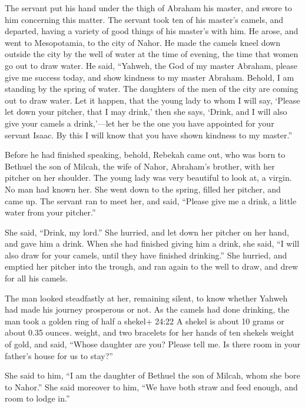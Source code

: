  The servant put his hand under the thigh of Abraham his
master, and swore to him concerning this matter.  The
servant took ten of his master's camels, and departed, having a variety
of good things of his master's with him. He arose, and went to
Mesopotamia, to the city of Nahor.  He made the camels
kneel down outside the city by the well of water at the time of evening,
the time that women go out to draw water.  He said,
``Yahweh, the God of my master Abraham, please give me success today,
and show kindness to my master Abraham.  Behold, I am
standing by the spring of water. The daughters of the men of the city
are coming out to draw water.  Let it happen, that the
young lady to whom I will say, `Please let down your pitcher, that I may
drink,' then she says, `Drink, and I will also give your camels a
drink,'---let her be the one you have appointed for your servant Isaac.
By this I will know that you have shown kindness to my master.''

 Before he had finished speaking, behold, Rebekah came out,
who was born to Bethuel the son of Milcah, the wife of Nahor, Abraham's
brother, with her pitcher on her shoulder.  The young lady
was very beautiful to look at, a virgin. No man had known her. She went
down to the spring, filled her pitcher, and came up.  The
servant ran to meet her, and said, ``Please give me a drink, a little
water from your pitcher.''

 She said, ``Drink, my lord.'' She hurried, and let down
her pitcher on her hand, and gave him a drink.  When she
had finished giving him a drink, she said, ``I will also draw for your
camels, until they have finished drinking.''  She hurried,
and emptied her pitcher into the trough, and ran again to the well to
draw, and drew for all his camels.

 The man looked steadfastly at her, remaining silent, to
know whether Yahweh had made his journey prosperous or not.
 As the camels had done drinking, the man took a golden
ring of half a shekel+ 24:22 A shekel is about 10 grams or about 0.35
ounces. weight, and two bracelets for her hands of ten shekels weight of
gold,  and said, ``Whose daughter are you? Please tell me.
Is there room in your father's house for us to stay?''

 She said to him, ``I am the daughter of Bethuel the son of
Milcah, whom she bore to Nahor.''  She said moreover to
him, ``We have both straw and feed enough, and room to lodge in.''

